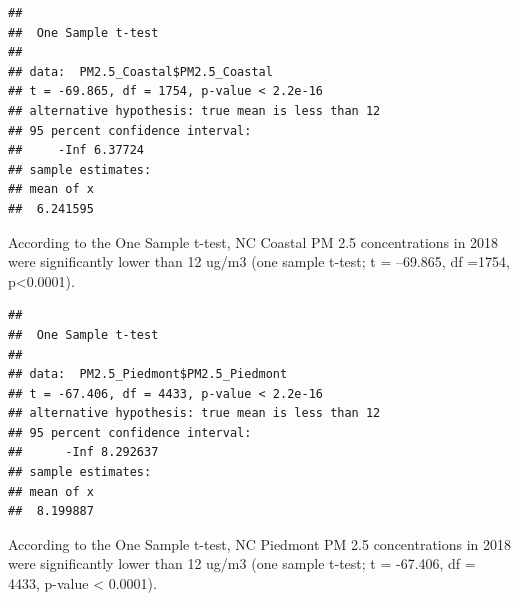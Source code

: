 \documentclass[12pt,]{article}
\newenvironment{Shaded}{\begin{snugshade}}{\end{snugshade}}
\newcommand{\KeywordTok}[1]{\textcolor[rgb]{0.13,0.29,0.53}{\textbf{#1}}}
\newcommand{\DataTypeTok}[1]{\textcolor[rgb]{0.13,0.29,0.53}{#1}}
\newcommand{\DecValTok}[1]{\textcolor[rgb]{0.00,0.00,0.81}{#1}}
\newcommand{\StringTok}[1]{\textcolor[rgb]{0.31,0.60,0.02}{#1}}
\newcommand{\OperatorTok}[1]{\textcolor[rgb]{0.81,0.36,0.00}{\textbf{#1}}}
\newcommand{\NormalTok}[1]{#1}
\begin{document}
\begin{Shaded}
\end{Shaded}

\begin{verbatim}
## 
##  One Sample t-test
## 
## data:  PM2.5_Coastal$PM2.5_Coastal
## t = -69.865, df = 1754, p-value < 2.2e-16
## alternative hypothesis: true mean is less than 12
## 95 percent confidence interval:
##     -Inf 6.37724
## sample estimates:
## mean of x 
##  6.241595
\end{verbatim}

According to the One Sample t-test, NC Coastal PM 2.5 concentrations in
2018 were significantly lower than 12 ug/m3 (one sample t-test; t =
--69.865, df =1754, p\textless{}0.0001).

\begin{Shaded}
\end{Shaded}

\begin{verbatim}
## 
##  One Sample t-test
## 
## data:  PM2.5_Piedmont$PM2.5_Piedmont
## t = -67.406, df = 4433, p-value < 2.2e-16
## alternative hypothesis: true mean is less than 12
## 95 percent confidence interval:
##      -Inf 8.292637
## sample estimates:
## mean of x 
##  8.199887
\end{verbatim}

According to the One Sample t-test, NC Piedmont PM 2.5 concentrations in
2018 were significantly lower than 12 ug/m3 (one sample t-test; t =
-67.406, df = 4433, p-value \textless{} 0.0001).

\begin{Shaded}
\end{Shaded}
\end{document}
